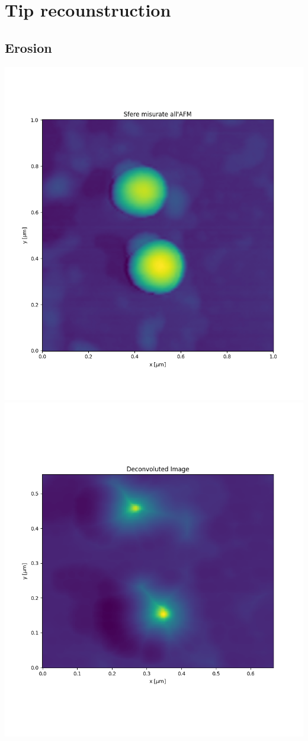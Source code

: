 \documentclass{article}
\begin{document}
\newpage

\section{Tip recounstruction}\label{sec:Tip_recounstruction}
\subsection{Erosion}\label{subsec:Erosion}

\begin{center}
    \includegraphics[width=.45\textwidth]{../images/deco_2d_1.png}
    \hfill
    \includegraphics[width=.45\textwidth]{../images/deco_2d_2.png}
    \label{fig:decon2d}
\end{center}
\end{document}
